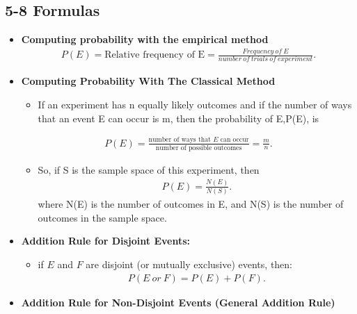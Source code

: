 \documentclass{report}
\begin{document}
    \pagebreak 
    \subsection*{5-8 Formulas}
    \bigbreak \noindent 
        \begin{itemize}
        \item \textbf{Computing probability with the empirical method}
        \begin{align*}
            P(E) = \text{Relative frequency of E} = \frac{Frequency\ of\ E}{number\ of\ trials\ of\ experiment}
        .\end{align*}
      \item \textbf{Computing Probability With The Classical Method}
            \begin{itemize}
                \item If an experiment has n equally likely outcomes and if the number of ways that an event E can occur is m, then the probability of E,P(E), is
            \end{itemize}
            \begin{align*}
                P(E) = \frac{\text{number of ways that $E$ can occur}}{\text{number of possible outcomes}} = \frac{m}{n}
            .\end{align*}
            \begin{itemize}
                \item So, if S is the sample space of this experiment, then
                    \begin{align*}
                        P(E) = \frac{N(E)}{N(S)}
                    .\end{align*}
            where N(E) is the number of outcomes in E, and N(S) is the number of outcomes in the sample space.
            \end{itemize}
                    \item \textbf{Addition Rule for Disjoint Events:}
            \begin{itemize}
                \item if $E $ and $F $ are disjoint (or mutually exclusive) events, then:
                    \begin{align*}
                        P(E\ or\ F) = P(E) + P(F)
                    .\end{align*}
            \end{itemize}
        \item \textbf{Addition Rule for Non-Disjoint Events (General Addition Rule)}

\end{itemize}
\end{document}
